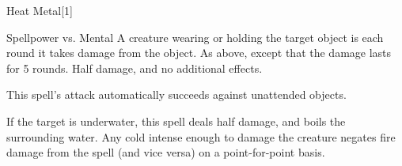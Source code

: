 \begin{spellfooter}
\begin{spellsection}{Heat Metal}[1]
\begin{spellcontent}
\begin{spelleffects}
\begin{spellattack}{Spellpower vs. Mental}
                A creature wearing or holding the target object is \dazed each round it takes damage from the object.
                \spellcritical As above, except that the damage lasts for 5 rounds.
                \spellfailure Half damage, and no additional effects.
            \end{spellattack}
        \end{spelleffects}
    \end{spellcontent}
    \begin{spellfooter}
        \spellnotes This spell's attack automatically succeeds against unattended objects.

        If the target is underwater, this spell deals half damage, and boils the surrounding water. Any cold intense enough to damage the creature negates fire damage from the spell (and vice versa) on a point-for-point basis.
        \miscastrandom
    \end{spellfooter}
\end{spellsection}


\end{spellfooter}
